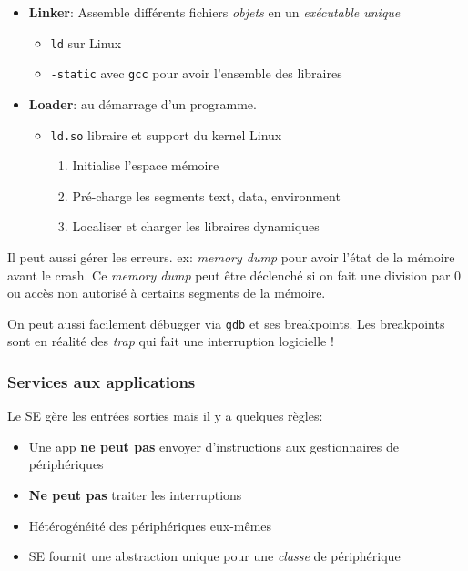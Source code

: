 \begin{itemize}
\tightlist
\item
  \textbf{Linker}: Assemble différents fichiers \emph{objets} en un
  \emph{exécutable unique}

  \begin{itemize}
  \tightlist
  \item
    \texttt{ld} sur Linux
  \item
    \texttt{-static} avec \texttt{gcc} pour avoir l'ensemble des
    libraires
  \end{itemize}
\item
  \textbf{Loader}: au démarrage d'un programme.

  \begin{itemize}
  \tightlist
  \item
    \texttt{ld.so} libraire et support du kernel Linux

    \begin{enumerate}
    \def\labelenumi{\arabic{enumi}.}
    \tightlist
    \item
      Initialise l'espace mémoire
    \item
      Pré-charge les segments text, data, environment
    \item
      Localiser et charger les libraires dynamiques
    \end{enumerate}
  \end{itemize}
\end{itemize}

Il peut aussi gérer les erreurs. ex: \emph{memory dump} pour avoir
l'état de la mémoire avant le crash. Ce \emph{memory dump} peut être
déclenché si on fait une division par 0 ou accès non autorisé à certains
segments de la mémoire.

On peut aussi facilement débugger via \texttt{gdb} et ses breakpoints.
Les breakpoints sont en réalité des \emph{trap} qui fait une
interruption logicielle !

\subsubsection{Services aux
applications}\label{services-aux-applications}

Le SE gère les entrées sorties mais il y a quelques règles:

\begin{itemize}
\tightlist
\item
  Une app \textbf{ne peut pas} envoyer d'instructions aux gestionnaires
  de périphériques
\item
  \textbf{Ne peut pas} traiter les interruptions
\item
  Hétérogénéité des périphériques eux-mêmes
\item
  SE fournit une abstraction unique pour une \emph{classe} de
  périphérique
\end{itemize}

